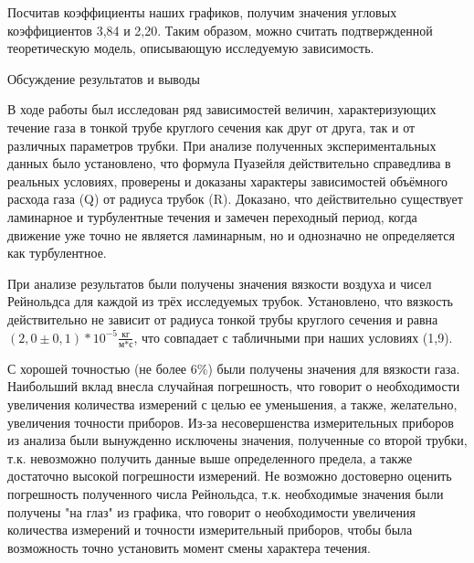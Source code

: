 \documentclass[12pt,a4paper]{article}
\begin{document}
Посчитав коэффициенты наших графиков, получим значения угловых коэффициентов 3,84 и 2,20. Таким образом, можно считать подтвержденной теоретическую модель, описывающую исследуемую зависимость.
\newpage
\begin{center}
\large Обсуждение результатов и выводы
\end{center}
\par В ходе работы был исследован ряд зависимостей величин, характеризующих течение газа в тонкой трубе круглого сечения как друг от друга, так и от различных параметров трубки. При анализе полученных экспериментальных данных было установлено, что формула Пуазейля действительно справедлива в реальных условиях, проверены и доказаны характеры зависимостей объёмного расхода газа (Q) от радиуса трубок (R). Доказано, что действительно существует ламинарное и турбулентные течения и замечен переходный период, когда движение уже точно не является ламинарным, но и однозначно не определяется как турбулентное.
\par При анализе результатов были получены значения вязкости воздуха и чисел Рейнольдса для каждой из трёх исследуемых трубок. Установлено, что вязкость действительно не зависит от радиуса тонкой трубы круглого сечения и равна $(2,0\pm 0,1)*10^{-5}\frac{\text{кг}}{\text{м*с}}$, что совпадает с табличными при наших условиях (1,9).
\par С хорошей точностью (не более 6\%) были получены значения для вязкости газа. Наибольший вклад внесла случайная погрешность, что говорит о необходимости увеличения количества измерений с целью ее уменьшения, а также, желательно, увеличения точности приборов. Из-за несовершенства измерительных приборов из анализа были вынужденно исключены значения, полученные со второй трубки, т.к. невозможно получить данные выше определенного предела, а также достаточно высокой погрешности измерений. Не возможно достоверно оценить погрешность полученного числа Рейнольдса, т.к. необходимые значения были получены "на глаз" из графика, что говорит о необходимости увеличения количества измерений и точности измерительный приборов, чтобы была возможность точно установить момент смены характера течения. 
\end{document}

